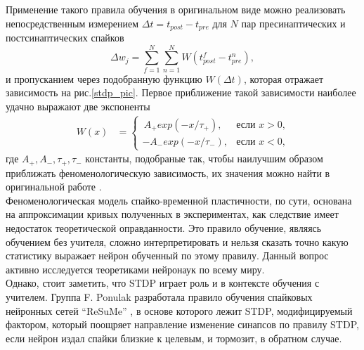 \documentclass[a4paper,10pt]{article}
\begin{document}
\indent Применение такого правила обучения в оригинальном виде можно реализовать непосредственным измерением $\Delta t = t_{post}-t_{pre}$ для $N$ пар пресинаптических и постсинаптических спайков
\begin{equation}\label{eq:sum_stdp}
\Delta w_{j} = \sum_{f=1}^N \sum_{n=1}^{N} W(t_{post}^{f} - t_{pre}^{n}),
\end{equation}
 и пропусканием через подобранную функцию $W(\Delta t)$, которая отражает зависимость на рис.\ref{stdp_pic}. Первое приближение такой зависимости наиболее удачно выражают две экспоненты
\begin{equation}
\begin{split}
W(x) &=\begin{cases} \, A_{+} exp(-x/\tau_{+}), & \mbox{если }x>0\mbox{,} \\ -A_{-} exp(-x/\tau_{-}), & \mbox{если }x<0\mbox{,} \end{cases}
\end{split}
\end{equation}
где $A_{+},A_{-},\tau_{+}, \tau_{-}$ константы, подобраные так, чтобы наилучшим образом приближать феноменологическую зависимость, их значения можно найти в оригинальной работе \cite{SongStdp}.\\
\indent Феноменологическая модель спайко-временной пластичности, по сути, основана на аппроксимации кривых полученных в экспериментах, как следствие имеет недостаток теоретической оправданности. Это правило обучение, являясь обучением без учителя, сложно интерпретировать и нельзя сказать точно какую статистику выражает нейрон обученный по этому правилу. Данный вопрос активно исследуется теоретиками нейронаук по всему миру.\\
\indent Однако, стоит заметить, что STDP играет роль и в контексте обучения с учителем. Группа F. Ponulak разработала правило обучения спайковых нейронных сетей ``ReSuMe'' \cite{ponulak2010supervised}, в основе которого лежит STDP, модифицируемый фактором, который поощряет направление изменение синапсов по правилу STDP, если нейрон издал спайки близкие к целевым, и тормозит, в обратном случае.\\   
\end{document}
